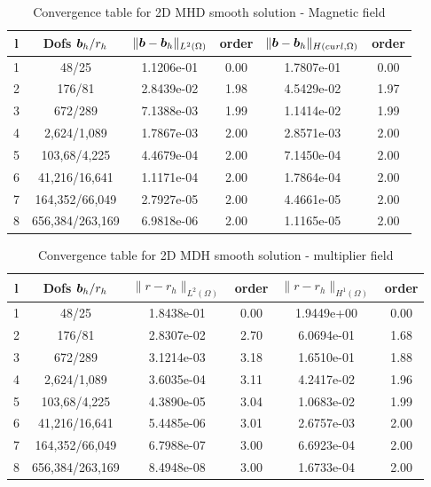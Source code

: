 \begin{table}[h!] \small
\begin{center}
\begin{tabular}{cccccc}
\hline
l &    Dofs $\boldsymbol b_h/r_h$ & $\|\boldsymbol b-\boldsymbol b_h\|_{L^2(\Omega)}$ & order & $\|\boldsymbol b-\boldsymbol b_h\|_{H(curl,\Omega)}$ & order \\
\hline
 1 &      48/25 &  1.1206e-01 &     0.00 &  1.7807e-01 &        0.00 \\
 2 &     176/81 &  2.8439e-02 &     1.98 &  4.5429e-02 &        1.97 \\
 3 &     672/289 &  7.1388e-03 &     1.99 &  1.1414e-02 &        1.99 \\
 4 &    2,624/1,089 &  1.7867e-03 &     2.00 &  2.8571e-03 &        2.00 \\
 5 &   103,68/4,225 &  4.4679e-04 &     2.00 &  7.1450e-04 &        2.00 \\
 6 &   41,216/16,641 &  1.1171e-04 &     2.00 &  1.7864e-04 &        2.00 \\
 7 &  164,352/66,049 &  2.7927e-05 &     2.00 &  4.4661e-05 &        2.00 \\
 8 &  656,384/263,169 &  6.9818e-06 &     2.00 &  1.1165e-05 &        2.00 \\
\hline
\end{tabular}
\caption{Convergence table for 2D MHD smooth solution - Magnetic field}
\label{tab:MHD_2D_smooth_magnetic}
\end{center}
\end{table}



\begin{table}[h!] \small
\begin{center}
\begin{tabular}{cccccc}
\hline
l &    Dofs $\boldsymbol b_h/r_h$ & $\|{r}-{r}_h\|_{L^2(\Omega)}$ & order & $\|{r}-{r}_h\|_{H^1(\Omega)}$ & order\\
\hline
 1 &      48/25  &  1.8438e-01 &     0.00 &  1.9449e+00 &     0.00 \\
 2 &     176/81  &  2.8307e-02 &     2.70 &  6.0694e-01 &     1.68 \\
 3 &     672/289  &  3.1214e-03 &     3.18 &  1.6510e-01 &     1.88 \\
 4 &    2,624/1,089  &  3.6035e-04 &     3.11 &  4.2417e-02 &     1.96 \\
 5 &   103,68/4,225  &  4.3890e-05 &     3.04 &  1.0683e-02 &     1.99 \\
 6 &   41,216/16,641  &  5.4485e-06 &     3.01 &  2.6757e-03 &     2.00 \\
 7 &  164,352/66,049  &  6.7988e-07 &     3.00 &  6.6923e-04 &     2.00 \\
 8 &  656,384/263,169  &  8.4948e-08 &     3.00 &  1.6733e-04 &     2.00 \\
\hline
\end{tabular}
\caption{Convergence table for 2D MDH smooth solution - multiplier field}
\label{tab:MHD_2D_smooth_multiplier}
\end{center}
\end{table}

